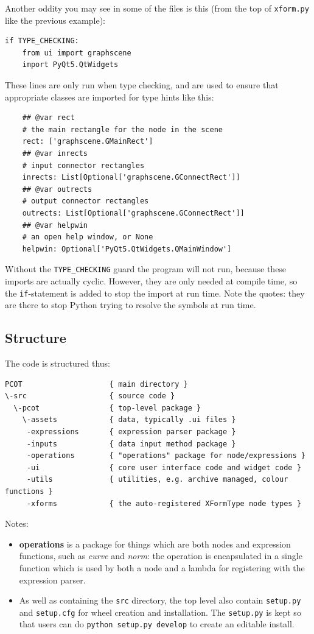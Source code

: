 Another oddity you may see in some of the files is this (from the top
of \texttt{xform.py} like the previous example):
\begin{lstlisting}
if TYPE_CHECKING:
    from ui import graphscene
    import PyQt5.QtWidgets
\end{lstlisting}
These lines are only run when type checking, and are used to ensure
that appropriate classes are imported for type hints like this:
\begin{lstlisting}
    ## @var rect
    # the main rectangle for the node in the scene
    rect: ['graphscene.GMainRect']
    ## @var inrects
    # input connector rectangles
    inrects: List[Optional['graphscene.GConnectRect']]
    ## @var outrects
    # output connector rectangles
    outrects: List[Optional['graphscene.GConnectRect']]
    ## @var helpwin
    # an open help window, or None
    helpwin: Optional['PyQt5.QtWidgets.QMainWindow']
\end{lstlisting}
Without the \texttt{TYPE\_CHECKING} guard the program will not run, because
these imports are actually cyclic. However, they are only needed at 
compile time, so the \texttt{if}-statement is added to stop the import
at run time. Note the quotes: they are there to stop Python trying to
resolve the symbols at run time.

\subsection{Structure}
The code is structured thus:
\begin{verbatim}
PCOT                    { main directory }
\-src                   { source code }
  \-pcot                { top-level package }
    \-assets            { data, typically .ui files }
     -expressions       { expression parser package }
     -inputs            { data input method package }
     -operations        { "operations" package for node/expressions }
     -ui                { core user interface code and widget code }
     -utils             { utilities, e.g. archive managed, colour functions }
     -xforms            { the auto-registered XFormType node types }
\end{verbatim}
Notes:
\begin{itemize}
\item \textbf{operations} is a package for things which are both nodes and
expression functions, such as \emph{curve} and \emph{norm}: the operation
is encapsulated in a single function which is used by both a node
and a lambda for registering with the expression parser.
\item As well as containing the \texttt{src} directory, the top level
also contain \texttt{setup.py} and \texttt{setup.cfg} for wheel creation
and installation. The \texttt{setup.py} is kept so that users can do
\texttt{python setup.py develop} to create an editable install.
\end{itemize}


